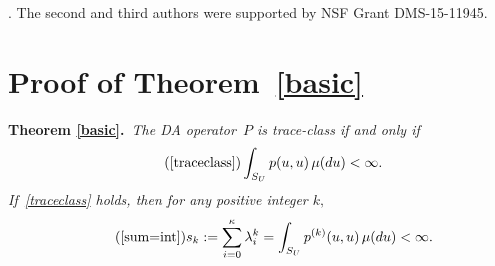 \documentclass[11pt]{article}
\begin{document}
	
	
	\vspace*{5mm}
	
	.  The second and third authors were supported by NSF Grant DMS-15-11945.
	
	
	\vspace*{12mm}
	\appendix
	
	\section{Proof of Theorem~\ref{basic}}

	\vspace*{3mm}
	\noindent
	{\bf Theorem \ref{basic}.\,}
	\textit{
		The DA operator~$P$ is trace-class if and only if
		\begin{equation} \tag{\ref{traceclass}}
		\int_{S_U} p(u,u) \, \mu(du) < \infty.
		\end{equation}
		If~\eqref{traceclass} holds, then for any positive integer $k,$
		\begin{equation} \tag{\ref{sum=int}}
		s_k := \sum_{i=0}^{\kappa} \lambda_i^k = \int_{S_U} p^{(k)}(u,u) \, \mu(du) < \infty.
		\end{equation}
		}
		
\end{document}

